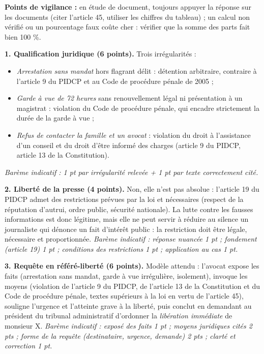 \documentclass[11pt]{article}
\begin{document}
\begin{corrige}
\textbf{Points de vigilance :} en étude de document, toujours appuyer la réponse sur les documents (citer l'article 45, utiliser les chiffres du tableau) ; un calcul non vérifié ou un pourcentage faux coûte cher : vérifier que la somme des parts fait bien 100 \%.
\end{corrige}

\begin{corrige}
\textbf{1. Qualification juridique (6 points).} Trois irrégularités :
\begin{itemize}
\item \emph{Arrestation sans mandat} hors flagrant délit : détention arbitraire, contraire à l'article 9 du PIDCP et au Code de procédure pénale de 2005 ;
\item \emph{Garde à vue de 72 heures} sans renouvellement légal ni présentation à un magistrat : violation du Code de procédure pénale, qui encadre strictement la durée de la garde à vue ;
\item \emph{Refus de contacter la famille et un avocat} : violation du droit à l'assistance d'un conseil et du droit d'être informé des charges (article 9 du PIDCP, article 13 de la Constitution).
\end{itemize}
\emph{Barème indicatif : 1 pt par irrégularité relevée + 1 pt par texte correctement cité.}

\textbf{2. Liberté de la presse (4 points).} Non, elle n'est pas absolue : l'article 19 du PIDCP admet des restrictions prévues par la loi et nécessaires (respect de la réputation d'autrui, ordre public, sécurité nationale). La lutte contre les fausses informations est donc légitime, mais elle ne peut servir à réduire au silence un journaliste qui dénonce un fait d'intérêt public : la restriction doit être légale, nécessaire et proportionnée. \emph{Barème indicatif : réponse nuancée 1 pt ; fondement (article 19) 1 pt ; conditions des restrictions 1 pt ; application au cas 1 pt.}

\textbf{3. Requête en référé-liberté (6 points).} Modèle attendu : l'avocat expose les faits (arrestation sans mandat, garde à vue irrégulière, isolement), invoque les moyens (violation de l'article 9 du PIDCP, de l'article 13 de la Constitution et du Code de procédure pénale, textes supérieurs à la loi en vertu de l'article 45), souligne l'urgence et l'atteinte grave à la liberté, puis conclut en demandant au président du tribunal administratif d'ordonner la \emph{libération immédiate} de monsieur X. \emph{Barème indicatif : exposé des faits 1 pt ; moyens juridiques cités 2 pts ; forme de la requête (destinataire, urgence, demande) 2 pts ; clarté et correction 1 pt.}


\end{corrige}
\end{document}
